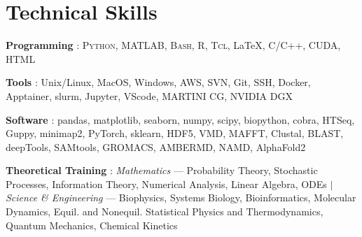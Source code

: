 \documentclass[letterpaper,10pt]{article}
\newcommand{\sectionspace}{
\vspace{-17pt}
}
\newcommand{\subheadingtitlevspace}{
\vspace{-3pt}
}
\newcommand{\titleItem}[1]{
  \textbf{#1}
}
\begin{document}
 \section{\textcolor{color1}{Technical Skills}}
 \subheadingtitlevspace
 \begin{itemize}[leftmargin=0.15in, label={}]
   {\item{
       \vspace{1pt}
       \titleItem{Programming}{: \textsc{Python, MATLAB, Bash, R, Tcl}, \LaTeX, C/C++, CUDA, HTML}\\
       \vspace{1pt}
       \titleItem{Tools}{: Unix/Linux, MacOS, Windows, AWS, SVN, Git, SSH, Docker, Apptainer, slurm, Jupyter, VScode, MARTINI CG, NVIDIA DGX}\\
       \vspace{1pt}
       \titleItem{Software}{: pandas, matplotlib, seaborn, numpy, scipy, biopython, cobra, HTSeq, Guppy, minimap2, PyTorch, sklearn, HDF5, VMD, MAFFT, Clustal, BLAST, deepTools, SAMtools, GROMACS, AMBERMD, NAMD, AlphaFold2} \\
       \vspace{1pt}
       \titleItem{Theoretical Training}{:
       	\emph{Mathematics} --- Probability Theory, Stochastic Processes, Information Theory, Numerical Analysis, Linear Algebra, ODEs
       	 $|$ 
       	\emph{Science \& Engineering} --- Biophysics, Systems Biology, Bioinformatics, Molecular Dynamics, Equil. and Nonequil. Statistical Physics and Thermodynamics, Quantum Mechanics, Chemical Kinetics}
     }}
 \end{itemize}
 \sectionspace

\end{document}
